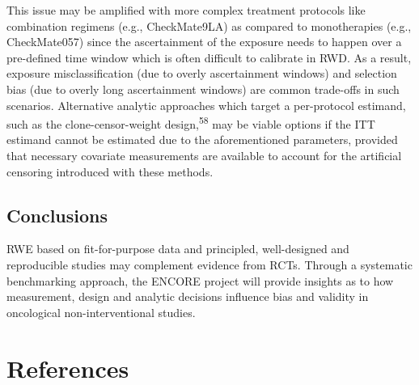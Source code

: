 \documentclass[
  letterpaper,
  DIV=11,
  numbers=noendperiod]{scrartcl}
\begin{document}
This issue may be amplified with more complex treatment protocols like
combination regimens (e.g., CheckMate9LA) as compared to monotherapies
(e.g., CheckMate057) since the ascertainment of the exposure needs to
happen over a pre-defined time window which is often difficult to
calibrate in RWD. As a result, exposure misclassification (due to overly
ascertainment windows) and selection bias (due to overly long
ascertainment windows) are common trade-offs in such scenarios.
Alternative analytic approaches which target a per-protocol estimand,
such as the clone-censor-weight design,\textsuperscript{58} may be
viable options if the ITT estimand cannot be estimated due to the
aforementioned parameters, provided that necessary covariate
measurements are available to account for the artificial censoring
introduced with these methods.

\subsection{Conclusions}\label{conclusions}

RWE based on fit-for-purpose data and principled, well-designed and
reproducible studies may complement evidence from RCTs. Through a
systematic benchmarking approach, the ENCORE project will provide
insights as to how measurement, design and analytic decisions influence
bias and validity in oncological non-interventional studies.

\newpage{}

\section*{References}\label{references}
\end{document}
